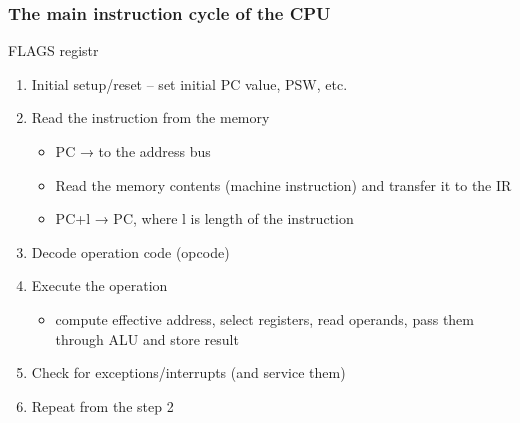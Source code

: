 \documentclass{beamer}
\begin{document}
\begin{frame}
\frametitle{The main instruction cycle of the CPU}
FLAGS registr 
\begin{enumerate}
  \item Initial setup/reset – set initial PC value, PSW, etc.
  \item Read the instruction from the memory
  \begin{itemize}
    \item PC → to the address bus
    \item Read the memory contents (machine instruction) and transfer it to the IR
    \item PC+l → PC, where l is length of the instruction
  \end{itemize}
  \item Decode operation code (opcode)
  \item Execute the operation
  \begin{itemize}
    \item compute effective address, select registers, read operands, pass them  through ALU and store result
  \end{itemize}
  \item Check for exceptions/interrupts (and service them)
  \item Repeat from the step 2
\end{enumerate}
\end{frame}
\end{document}

